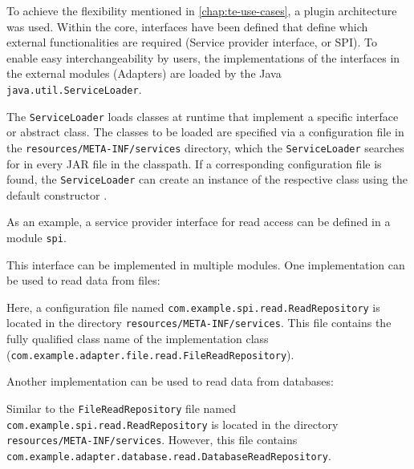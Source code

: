 To achieve the flexibility mentioned in \autoref{chap:te-use-cases}, a plugin architecture was used.
Within the core, interfaces have been defined that define which external functionalities are required (Service provider interface, or SPI).
To enable easy interchangeability by users, the implementations of the interfaces in the external modules (Adapters) are loaded by the Java \verb|java.util.ServiceLoader|.

The \verb|ServiceLoader| loads classes at runtime that implement a specific interface or abstract class.
The classes to be loaded are specified via a configuration file in the \verb|resources/META-INF/services| directory, which the \verb|ServiceLoader| searches for in every JAR file in the classpath.
If a corresponding configuration file is found, the \verb|ServiceLoader| can create an instance of the respective class using the default constructor \cite{java-service-loader}.

As an example, a service provider interface for read access can be defined in a module \verb|spi|.



\noindent
This interface can be implemented in multiple modules.
One implementation can be used to read data from files:



\noindent
Here, a configuration file named \verb|com.example.spi.read.ReadRepository| is located in the directory \verb|resources/META-INF/services|.
This file contains the fully qualified class name of the implementation class \\(\verb|com.example.adapter.file.read.FileReadRepository|).

Another implementation can be used to read data from databases:



\noindent
Similar to the \verb|FileReadRepository| file named \\\verb|com.example.spi.read.ReadRepository| is located in the directory \\\verb|resources/META-INF/services|.
However, this file contains \\\verb|com.example.adapter.database.read.DatabaseReadRepository|.

